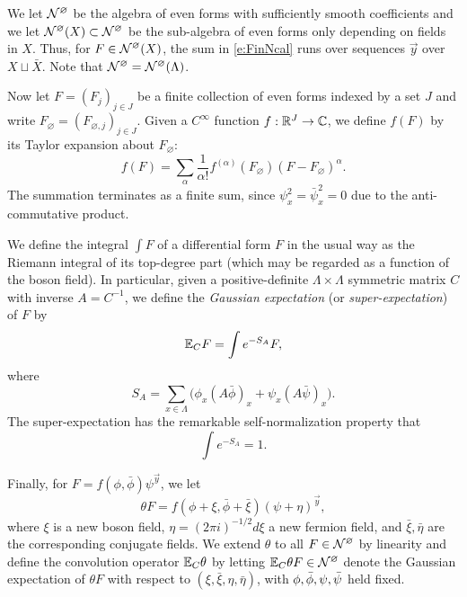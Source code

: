 We let $\mathcal{N}^\varnothing$ be the algebra of even forms with sufficiently smooth coefficients
and we let $\mathcal{N}^\varnothing(X) \subset \mathcal{N}^\varnothing$ be the sub-algebra of even forms only depending on fields
in $X$. Thus, for $F \in \mathcal{N}^\varnothing(X)$, the sum in \eqref{e:FinNcal} runs over sequences $\vec y$
over $X \sqcup \bar X$.
Note that $\mathcal{N}^\varnothing = \mathcal{N}^\varnothing(\Lambda)$.


Now let $F = (F_j)_{j \in J}$ be a finite collection of even forms
indexed by a set $J$
and write $F_\varnothing = (F_{\varnothing,j})_{j \in J}$.
Given a $C^\infty$ function $f : {\mathbb R}^J \rightarrow \mathbb{C}$, we define
$f(F)$ by its Taylor expansion about $F_\varnothing$:
\begin{equation}
f(F) = \sum_\alpha \frac{1}{\alpha!} f^{(\alpha)}(F_\varnothing) (F - F_\varnothing)^\alpha.
\end{equation}
The summation terminates as a finite sum,
since $\psi_x^2 = \bar\psi_x^2 = 0$ due to the anti-commut\-ative product.

We define the integral
$\int F$
of a differential form $F$ in the usual way
as the Riemann integral of its top-degree part
(which may be regarded as a function
of the boson field).
In particular, given a positive-definite
$\Lambda \times \Lambda$ symmetric matrix $C$
with inverse $A = C^{-1}$,
we define the \emph{Gaussian expectation}
(or \emph{super-expectation}) of $F$ by
\begin{equation}
\lbeq{ExCF}
\Ex_C F = \int e^{-S_A} F,
\end{equation}
where
\begin{equation}
\label{e:action}
S_A = \sum_{x\in\Lambda} \Big(\phi_x (A\bar\phi)_x + \psi_x (A \bar\psi)_x\Big).
\end{equation}
{The super-expectation has the remarkable self-normalization property that}
\begin{equation}
\label{e:self-normal}
\int e^{-S_A} = 1.
\end{equation}

Finally, for $F = f(\phi, \bar\phi) \psi^{\vec y}$,
we let
\begin{equation}
\theta F = f(\phi + \xi, \bar\phi + \bar\xi) (\psi + \eta)^{\vec y},
\end{equation}
where $\xi$ is a new boson field, $\eta = (2\pi i)^{-1/2} d\xi$ a new fermion field,
and $\bar\xi, \bar\eta$ are the corresponding conjugate fields.
We extend $\theta$ to all $F \in \mathcal{N}^\varnothing$ by linearity
and define the convolution operator $\mathbb{E}_C\theta$ by letting
$\mathbb{E}_C\theta F \in \mathcal{N}^\varnothing$ denote the Gaussian expectation of $\theta F$ with respect
to $(\xi, \bar\xi, \eta, \bar\eta)$, with $\phi,\bar\phi,\psi,\bar\psi$ held fixed.

